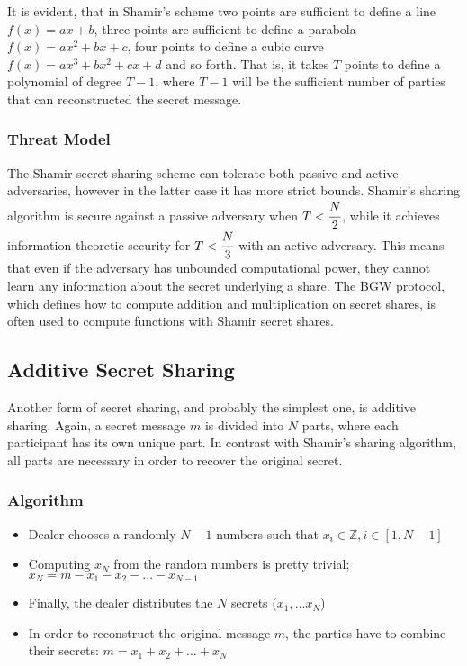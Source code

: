 It is evident, that in Shamir's scheme two points are sufficient to define a line $f(x) = ax + b$, three points are sufficient to define a parabola $f(x) = ax^2 + bx + c$, four points to define a cubic curve $f(x) = ax^3 + bx^2 + cx + d$ and so forth.
That is, it takes $T$ points to define a polynomial of degree $T-1$, where $T - 1$ will be the sufficient number of parties that can reconstructed the secret message.

\subsubsection{Threat Model}\label{sss:shamir-threat-model}
The Shamir secret sharing scheme can tolerate both passive and active adversaries, however in the latter case it has more strict bounds.
Shamir's sharing algorithm is secure against a passive adversary when $T < \cfrac{N}{2}$, while it achieves information-theoretic security for $T < \cfrac{N}{3}$ with an active adversary.
This means that even if the adversary has unbounded computational power, they cannot learn any information about the secret underlying a share.
The BGW \cite{brakerski2014leveled} protocol, which defines how to compute addition and multiplication on secret shares, is often used to compute functions with Shamir secret shares.



\subsection{Additive Secret Sharing}\label{ss:additive-secret-sharing}
Another form of secret sharing, and probably the simplest one, is additive sharing.
Again, a secret message $m$ is divided into $N$ parts, where each participant has its own unique part.
In contrast with Shamir's sharing algorithm, all parts are necessary in order to recover the original secret.

\subsubsection{Algorithm}\label{sss:additive-algorithm}
\begin{itemize}

  \item Dealer chooses a randomly $N - 1$ numbers such that $x_i \in \mathbb{Z}, i \in [1, N-1]$

  \item Computing $x_N$ from the random numbers is pretty trivial; $x_N = m - x_1 - x_2 - \dots - x_{N-1}$

  \item Finally, the dealer distributes the $N$ secrets ($x_1, \dots x_N$)

  \item In order to reconstruct the original message $m$, the parties have to combine their secrets: $m = x_1 + x_2 + \dots + x_N$
\end{itemize}

